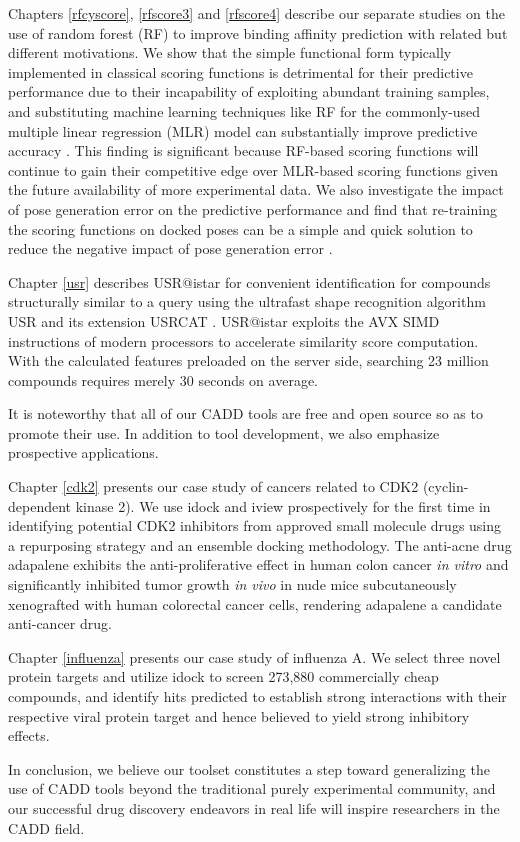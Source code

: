 Chapters \ref{rfcyscore}, \ref{rfscore3} and \ref{rfscore4} describe our separate studies \citep{1432,1433,1434} on the use of random forest (RF) to improve binding affinity prediction with related but different motivations. We show that the simple functional form typically implemented in classical scoring functions is detrimental for their predictive performance due to their incapability of exploiting abundant training samples, and substituting machine learning techniques like RF for the commonly-used multiple linear regression (MLR) model can substantially improve predictive accuracy \citep{1432,1433}. This finding is significant because RF-based scoring functions will continue to gain their competitive edge over MLR-based scoring functions given the future availability of more experimental data. We also investigate the impact of pose generation error on the predictive performance and find that re-training the scoring functions on docked poses can be a simple and quick solution to reduce the negative impact of pose generation error \citep{1434}.

Chapter \ref{usr} describes USR@istar for convenient identification for compounds structurally similar to a query using the ultrafast shape recognition algorithm USR \citep{1379} and its extension USRCAT \citep{1331}. USR@istar exploits the AVX SIMD instructions of modern processors to accelerate similarity score computation. With the calculated features preloaded on the server side, searching 23 million compounds requires merely 30 seconds on average.

It is noteworthy that all of our CADD tools are free and open source so as to promote their use. In addition to tool development, we also emphasize prospective applications.

Chapter \ref{cdk2} presents our case study of cancers related to CDK2 (cyclin-dependent kinase 2). We use idock \citep{1153,1362} and \citep{1366} iview prospectively for the first time in identifying potential CDK2 inhibitors from approved small molecule drugs using a repurposing strategy and an ensemble docking methodology. The anti-acne drug adapalene exhibits the anti-proliferative effect in human colon cancer \textit{in vitro} and significantly inhibited tumor growth \textit{in vivo} in nude mice subcutaneously xenografted with human colorectal cancer cells, rendering adapalene a candidate anti-cancer drug.

Chapter \ref{influenza} presents our case study of influenza A. We select three novel protein targets and utilize idock \citep{1153,1362} to screen 273,880 commercially cheap compounds, and identify hits predicted to establish strong interactions with their respective viral protein target and hence believed to yield strong inhibitory effects.

In conclusion, we believe our toolset constitutes a step toward generalizing the use of CADD tools beyond the traditional purely experimental community, and our successful drug discovery endeavors in real life will inspire researchers in the CADD field.

\chapterend
